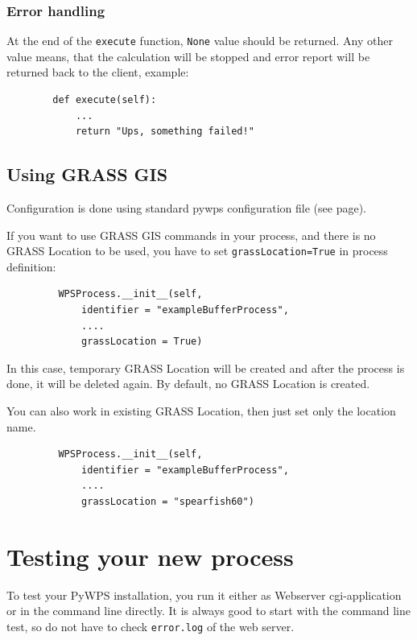 \documentclass[a4paper,11pt]{article}
\begin{document}
\subsubsection{Error handling}
    
At the end of the \texttt{execute} function, \texttt{None} value should be returned. Any other 
value means, that the calculation will be stopped and error report will be
returned back to the client, example:

\begin{verbatim}
        def execute(self):
            ...
            return "Ups, something failed!"
\end{verbatim}
    

\subsection{Using GRASS GIS}

Configuration is done using standard pywps configuration file (see
page\pageref{configuration}).


If you want to use GRASS GIS commands in your process, and there is no
GRASS Location to be used, you have to set \texttt{grassLocation=True} in
process definition:

\begin{verbatim}
         WPSProcess.__init__(self,
             identifier = "exampleBufferProcess",
             ....
             grassLocation = True)
\end{verbatim}

In this case, temporary GRASS Location will be created and after the
process is done, it will be deleted again. By default, no GRASS Location is
created.

You can also work in existing GRASS Location, then just set only the location
name.
\begin{verbatim}
         WPSProcess.__init__(self,
             identifier = "exampleBufferProcess",
             ....
             grassLocation = "spearfish60")
\end{verbatim}

\section{Testing your new process}

To test your PyWPS installation, you run it either as Webserver
cgi-application or in the command line directly. It is always good to start
with the command line test, so do not have to check \texttt{error.log} of
the web server.
\end{document}
